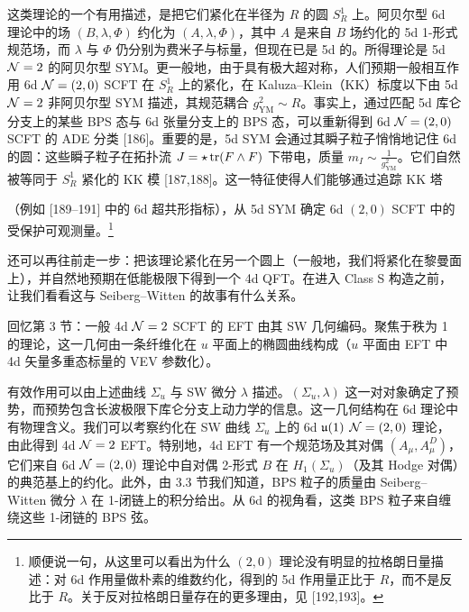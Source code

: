 这类理论的一个有用描述，是把它们紧化在半径为 $R$ 的圆 $S^1_R$ 上。阿贝尔型 6d 理论中的场 $(B,\lambda,\Phi)$ 约化为 $(A,\lambda,\Phi)$，其中 $A$ 是来自 $B$ 场约化的 5d 1-形式规范场，而 $\lambda$ 与 $\Phi$ 仍分别为费米子与标量，但现在已是 5d 的。所得理论是 5d $\mathcal{N}=2$ 的阿贝尔型 SYM。更一般地，由于具有极大超对称，人们预期一般相互作用 6d $\mathcal{N}=(2,0)$ SCFT 在 $S^1_R$ 上的紧化，在 Kaluza--Klein（KK）标度以下由 5d $\mathcal{N}=2$ 非阿贝尔型 SYM 描述，其规范耦合 $g^2_{\mathrm{YM}}\sim R$。事实上，通过匹配 5d 库仑分支上的某些 BPS 态与 6d 张量分支上的 BPS 态，可以重新得到 6d $\mathcal{N}=(2,0)$ SCFT 的 ADE 分类 [186]。重要的是，5d SYM 会通过其瞬子粒子悄悄地记住 6d 的圆：这些瞬子粒子在拓扑流 $J=\star\operatorname{tr}(F\wedge F)$ 下带电，质量 $m_I\sim\frac{1}{g^2_{\mathrm{YM}}}$。它们自然被等同于 $S^1_R$ 紧化的 KK 模 [187,188]。这一特征使得人们能够通过追踪 KK 塔

（例如 [189--191] 中的 6d 超共形指标），从 5d SYM 确定 6d $(2,0)$ SCFT 中的受保护可观测量。\footnote{顺便说一句，从这里可以看出为什么 $(2,0)$ 理论没有明显的拉格朗日量描述：对 6d 作用量做朴素的维数约化，得到的 5d 作用量正比于 $R$，而不是反比于 $R$。关于反对拉格朗日量存在的更多理由，见 [192,193]。}




还可以再往前走一步：把该理论紧化在另一个圆上（一般地，我们将紧化在黎曼面上），并自然地预期在低能极限下得到一个 4d QFT。在进入 Class S 构造之前，让我们看看这与 Seiberg--Witten 的故事有什么关系。

回忆第 3 节：一般 4d $\mathcal{N}=2$ SCFT 的 EFT 由其 SW 几何编码。聚焦于秩为 1 的理论，这一几何由一条纤维化在 $u$ 平面上的椭圆曲线构成（$u$ 平面由 EFT 中 4d 矢量多重态标量的 VEV 参数化）。

有效作用可以由上述曲线 $\Sigma_u$ 与 SW 微分 $\lambda$ 描述。$(\Sigma_u,\lambda)$ 这一对对象确定了预势，而预势包含长波极限下库仑分支上动力学的信息。这一几何结构在 6d 理论中有物理含义。我们可以考察约化在 SW 曲线 $\Sigma_u$ 上的 6d $\mathfrak{u}(1)$ $\mathcal{N}=(2,0)$ 理论，由此得到 4d $\mathcal{N}=2$ EFT。特别地，4d EFT 有一个规范场及其对偶 $(A_\mu,A^D_\mu)$，它们来自 6d $\mathcal{N}=(2,0)$ 理论中自对偶 2-形式 $B$ 在 $H_1(\Sigma_u)$（及其 Hodge 对偶）的典范基上的约化。此外，由 3.3 节我们知道，BPS 粒子的质量由 Seiberg--Witten 微分 $\lambda$ 在 1-闭链上的积分给出。从 6d 的视角看，这类 BPS 粒子来自缠绕这些 1-闭链的 BPS 弦。

